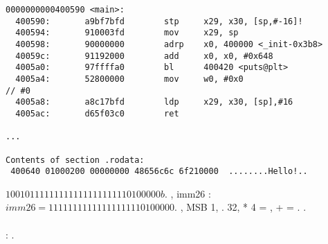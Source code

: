 \begin{lstlisting}[caption=objdump \EN{of executable file}\RU{исполняемого файла}]
0000000000400590 <main>:
  400590:       a9bf7bfd        stp     x29, x30, [sp,#-16]!
  400594:       910003fd        mov     x29, sp
  400598:       90000000        adrp    x0, 400000 <_init-0x3b8>
  40059c:       91192000        add     x0, x0, #0x648
  4005a0:       97ffffa0        bl      400420 <puts@plt>
  4005a4:       52800000        mov     w0, #0x0                        // #0
  4005a8:       a8c17bfd        ldp     x29, x30, [sp],#16
  4005ac:       d65f03c0        ret

...

Contents of section .rodata:
 400640 01000200 00000000 48656c6c 6f210000  ........Hello!..
\end{lstlisting}

  $10010111111111111111111110100000b$.
 \cite[C5.6.26]{ARM64ref}, 
imm26 : 
$imm26 = 11111111111111111110100000$.
 ,  \ac{MSB}  1, 
.
 32,  * 4 = , 
\AndENRU {} +  = .
 .\\
\\
: \cite{ARM64_ELF}.
